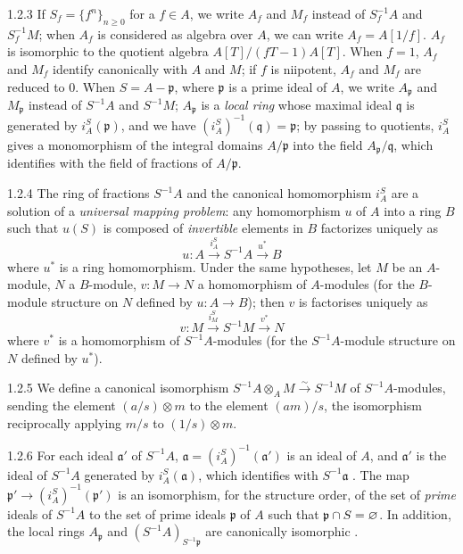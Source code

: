 \documentclass[10pt,oneside]{book}
\begin{document}
\begin{env}{1.2.3}
\label{env-0.1.2.3}
If $S_f=\{f^n\}_{n\geqslant 0}$ for a $f\in A$, we write $A_f$ and $M_f$ instead of
$S_f^{-1}A$ and $S_f^{-1}M$; when $A_f$ is considered as algebra over $A$, we can write
$A_f=A[1/f]$. $A_f$ is isomorphic to the quotient algebra $A[T]/(fT-1)A[T]$. When $f=1$,
$A_f$ and $M_f$ identify canonically with $A$ and $M$; if $f$ is niipotent, $A_f$ and $M_f$
are reduced to $0$. When $S=A-\mathfrak{p}$, where $\mathfrak{p}$ is a prime ideal of $A$, we
write $A_\mathfrak{p}$ and $M_\mathfrak{p}$ instead of $S^{-1}A$ and $S^{-1}M$;
$A_\mathfrak{p}$ is a \emph{local ring} whose maximal ideal $\mathfrak{q}$ is generated by
$i_A^S(\mathfrak{p})$, and we have $(i_A^S)^{-1}(\mathfrak{q})=\mathfrak{p}$; by passing to
quotients, $i_A^S$ gives a monomorphism of the integral domains $A/\mathfrak{p}$ into the
field $A_\mathfrak{p}/\mathfrak{q}$, which identifies with the field of fractions of
$A/\mathfrak{p}$.
\end{env}

\begin{env}{1.2.4}
\label{env-0.1.2.4}
The ring of fractions $S^{-1}A$ and the canonical homomorphism $i_A^S$ are a solution of a \emph{universal mapping problem}:
any homomorphism $u$ of $A$ into a ring $B$ such that $u(S)$ is composed of \emph{invertible} elements in $B$ factorizes uniquely as
\[
  u:A\xrightarrow{i_A^S}S^{-1}A\xrightarrow{u^*}B
\]
where $u^*$ is a ring homomorphism. Under the same hypotheses, let $M$ be an $A$-module, $N$
a $B$-module, $v:M\to N$ a homomorphism of $A$-modules (for the $B$-module structure on $N$
defined by $u:A\to B$); then $v$ is factorises uniquely as
\[
  v:M\xrightarrow{i_M^S}S^{-1}M\xrightarrow{v^*}N
\]
where $v^*$ is a homomorphism of $S^{-1}A$-modules (for the $S^{-1}A$-module structure on $N$
defined by $u^*$).
\end{env}

\begin{env}{1.2.5}
\label{env-0.1.2.5}
We define a canonical isomorphism $S^{-1}A\otimes_A M\xrightarrow{\sim}S^{-1}M$ of
$S^{-1}A$-modules, sending the element $(a/s)\otimes m$ to the element $(am)/s$, the
isomorphism reciprocally applying $m/s$ to $(1/s)\otimes m$.
\end{env}

\begin{env}{1.2.6}
\label{env-0.1.2.6}
For each ideal $\mathfrak{a}'$ of $S^{-1}A$, $\mathfrak{a}=(i_A^S)^{-1}(\mathfrak{a}')$ is an
ideal of $A$, and $\mathfrak{a}'$ is the ideal of $S^{-1}A$ generated by
$i_A^S(\mathfrak{a})$, which identifies with $S^{-1}\mathfrak{a}$ . The map
$\mathfrak{p}'\to(i_A^S)^{-1}(\mathfrak{p}')$ is an isomorphism, for the structure order, of
the set of \emph{prime} ideals of $S^{-1}A$ to the set of prime ideals $\mathfrak{p}$ of $A$
such that $\mathfrak{p}\cap S=\varnothing$. In addition, the local rings $A_\mathfrak{p}$ and
$(S^{-1}A)_{S^{-1}\mathfrak{p}}$ are canonically isomorphic .
\end{env}
\end{document}
